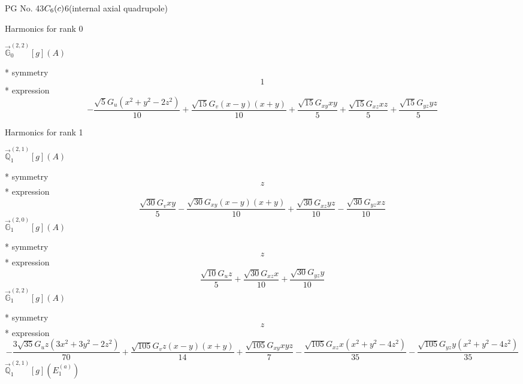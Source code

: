 \documentclass[fleqn,8pt]{jsarticle}
\begin{document}
\setcounter{MaxMatrixCols}{32}

\renewcommand{\tablename}{Table~}
\renewcommand{\figurename}{Figure~}
\begin{center}
\LARGE
PG No. 43\quad$C_{\rm 6}(c)$\quad$6$\quad[ hexagonal ] (internal axial quadrupole)
\end{center}

\noindent * Harmonics for rank 0

\noindent\quad $\vec{\mathbb{G}}_{0}^{(2,2)}[g](A)$

\noindent\quad ** symmetry
\begin{dmath*}
1
\end{dmath*}
\noindent\quad ** expression
\begin{dmath*}
- \frac{\sqrt{5} G_{u} \left(x^{2} + y^{2} - 2 z^{2}\right)}{10} + \frac{\sqrt{15} G_{v} \left(x - y\right) \left(x + y\right)}{10} + \frac{\sqrt{15} G_{xy} x y}{5} + \frac{\sqrt{15} G_{xz} x z}{5} + \frac{\sqrt{15} G_{yz} y z}{5}
\end{dmath*}

\noindent * Harmonics for rank 1

\noindent\quad $\vec{\mathbb{Q}}_{1}^{(2,1)}[g](A)$

\noindent\quad ** symmetry
\begin{dmath*}
z
\end{dmath*}
\noindent\quad ** expression
\begin{dmath*}
\frac{\sqrt{30} G_{v} x y}{5} - \frac{\sqrt{30} G_{xy} \left(x - y\right) \left(x + y\right)}{10} + \frac{\sqrt{30} G_{xz} y z}{10} - \frac{\sqrt{30} G_{yz} x z}{10}
\end{dmath*}
\noindent\quad $\vec{\mathbb{G}}_{1}^{(2,0)}[g](A)$

\noindent\quad ** symmetry
\begin{dmath*}
z
\end{dmath*}
\noindent\quad ** expression
\begin{dmath*}
\frac{\sqrt{10} G_{u} z}{5} + \frac{\sqrt{30} G_{xz} x}{10} + \frac{\sqrt{30} G_{yz} y}{10}
\end{dmath*}
\noindent\quad $\vec{\mathbb{G}}_{1}^{(2,2)}[g](A)$

\noindent\quad ** symmetry
\begin{dmath*}
z
\end{dmath*}
\noindent\quad ** expression
\begin{dmath*}
- \frac{3 \sqrt{35} G_{u} z \left(3 x^{2} + 3 y^{2} - 2 z^{2}\right)}{70} + \frac{\sqrt{105} G_{v} z \left(x - y\right) \left(x + y\right)}{14} + \frac{\sqrt{105} G_{xy} x y z}{7} - \frac{\sqrt{105} G_{xz} x \left(x^{2} + y^{2} - 4 z^{2}\right)}{35} - \frac{\sqrt{105} G_{yz} y \left(x^{2} + y^{2} - 4 z^{2}\right)}{35}
\end{dmath*}
\noindent\quad $\vec{\mathbb{Q}}_{1}^{(2,1)}[g](E_{1}^{(a)})$
\end{document}
